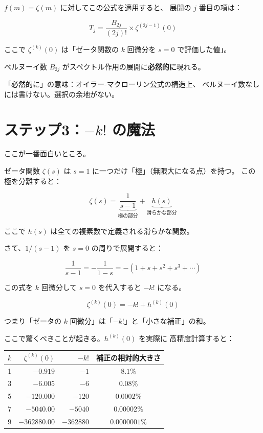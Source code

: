 \documentclass[11pt,a4paper]{article}
\begin{document}
$f(m) = \zeta(m)$ に対してこの公式を適用すると、
展開の $j$ 番目の項は：

$$T_j = \frac{B_{2j}}{(2j)!} \times \zeta^{(2j-1)}(0)$$

ここで $\zeta^{(k)}(0)$ は「ゼータ関数の $k$ 回微分を $s=0$ で評価した値」。

\begin{resultbox}
ベルヌーイ数 $B_{2j}$ がスペクトル作用の展開に\textbf{必然的に}現れる。

「必然的に」の意味：オイラー-マクローリン公式の構造上、
ベルヌーイ数なしには書けない。選択の余地がない。
\end{resultbox}

\section{ステップ3：$-k!$ の魔法}

ここが一番面白いところ。

ゼータ関数 $\zeta(s)$ は $s = 1$ に一つだけ「極」（無限大になる点）を持つ。
この極を分離すると：

$$\zeta(s) = \underbrace{\frac{1}{s-1}}_{\text{極の部分}} + \underbrace{h(s)}_{\text{滑らかな部分}}$$

ここで $h(s)$ は全ての複素数で定義される滑らかな関数。

さて、$1/(s-1)$ を $s = 0$ の周りで展開すると：

$$\frac{1}{s-1} = -\frac{1}{1-s} = -(1 + s + s^2 + s^3 + \cdots)$$

この式を $k$ 回微分して $s = 0$ を代入すると $-k!$ になる。

\begin{mathbox}[$-k!$ の公式]
$$\zeta^{(k)}(0) = -k! + h^{(k)}(0)$$

つまり「ゼータの $k$ 回微分」は「$-k!$」と「小さな補正」の和。
\end{mathbox}

ここで驚くべきことが起きる。$h^{(k)}(0)$ を実際に
高精度計算すると：

\begin{center}
\begin{tabular}{c|r|r|c}
$k$ & $\zeta^{(k)}(0)$ & $-k!$ & 補正の相対的大きさ \\
\hline
1 & $-0.919$ & $-1$ & $8.1\%$ \\
3 & $-6.005$ & $-6$ & $0.08\%$ \\
5 & $-120.000$ & $-120$ & $0.0002\%$ \\
7 & $-5040.00$ & $-5040$ & $0.00002\%$ \\
9 & $-362880.00$ & $-362880$ & $0.0000001\%$
\end{tabular}
\end{center}
\end{document}
